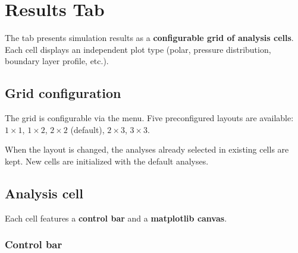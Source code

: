 \chapter{Results Tab}
\label{chap:resultats}

The  tab presents simulation results
as a \textbf{configurable grid of analysis
cells}. Each cell displays an independent plot type
(polar, pressure distribution, boundary layer profile,
etc.).



\section{Grid configuration}

The grid is configurable via the
 menu. Five preconfigured
layouts are available: $1\times1$, $1\times2$,
$2\times2$ (default), $2\times3$, $3\times3$.

\begin{noteinfo}
When the layout is changed, the analyses already
selected in existing cells are kept.
New cells are initialized with the default
analyses.
\end{noteinfo}

\section{Analysis cell}

Each cell features a \textbf{control bar} and a
\textbf{matplotlib canvas}.

\subsection{Control bar}

